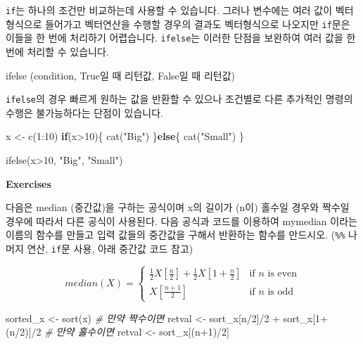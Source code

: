 \documentclass[
]{book}
\newenvironment{Shaded}{\begin{snugshade}}{\end{snugshade}}
\newcommand{\CommentTok}[1]{\textcolor[rgb]{0.56,0.35,0.01}{\textit{#1}}}
\newcommand{\ControlFlowTok}[1]{\textcolor[rgb]{0.13,0.29,0.53}{\textbf{#1}}}
\newcommand{\DecValTok}[1]{\textcolor[rgb]{0.00,0.00,0.81}{#1}}
\newcommand{\FunctionTok}[1]{\textcolor[rgb]{0.00,0.00,0.00}{#1}}
\newcommand{\NormalTok}[1]{#1}
\newcommand{\OtherTok}[1]{\textcolor[rgb]{0.56,0.35,0.01}{#1}}
\newcommand{\SpecialCharTok}[1]{\textcolor[rgb]{0.00,0.00,0.00}{#1}}
\newcommand{\StringTok}[1]{\textcolor[rgb]{0.31,0.60,0.02}{#1}}
\begin{document}
\texttt{if}는 하나의 조건만 비교하는데 사용할 수 있습니다. 그러나 변수에는 여러 값이 벡터형식으로 들어가고 벡터연산을 수행할 경우의 결과도 벡터형식으로 나오지만 \texttt{if}문은 이들을 한 번에 처리하기 어렵습니다. \texttt{ifelse}는 이러한 단점을 보완하여 여러 값을 한번에 처리할 수 있습니다.

\begin{Shaded}
\begin{Highlighting}[]
\FunctionTok{ifelse}\NormalTok{ (condition, True일 때 리턴값, False일 때 리턴값)}
\end{Highlighting}
\end{Shaded}

\texttt{ifelse}의 경우 빠르게 원하는 값을 반환할 수 있으나 조건별로 다른 추가적인 명령의 수행은 불가능하다는 단점이 있습니다.

\begin{Shaded}
\begin{Highlighting}[]

\NormalTok{x }\OtherTok{\textless{}{-}} \FunctionTok{c}\NormalTok{(}\DecValTok{1}\SpecialCharTok{:}\DecValTok{10}\NormalTok{)}
\ControlFlowTok{if}\NormalTok{(x}\SpecialCharTok{\textgreater{}}\DecValTok{10}\NormalTok{)\{}
  \FunctionTok{cat}\NormalTok{(}\StringTok{"Big"}\NormalTok{)}
\NormalTok{\}}\ControlFlowTok{else}\NormalTok{\{}
  \FunctionTok{cat}\NormalTok{(}\StringTok{"Small"}\NormalTok{)}
\NormalTok{\}}

\FunctionTok{ifelse}\NormalTok{(x}\SpecialCharTok{\textgreater{}}\DecValTok{10}\NormalTok{, }\StringTok{"Big"}\NormalTok{, }\StringTok{"Small"}\NormalTok{)}
\end{Highlighting}
\end{Shaded}

\textbf{Exercises}

다음은 median (중간값)을 구하는 공식이며 x의 길이가 (n이) 홀수일 경우와 짝수일 경우에 따라서 다른 공식이 사용된다. 다음 공식과 코드를 이용하여 mymedian 이라는 이름의 함수를 만들고 입력 값들의 중간값을 구해서 반환하는 함수를 만드시오. (\texttt{\%\%} 나머지 연산, \texttt{if}문 사용, 아래 중간값 코드 참고)

\[
median(X) =
\begin{cases}
\frac{1}{2} X[\frac{n}{2}] + \frac{1}{2} X[1+\frac{n}{2}] & \mbox{if } n \mbox{ is even} \\
X[\frac{n+1}{2}] & \mbox{if } n \mbox{ is odd}
\end{cases}
\]

\begin{Shaded}
\begin{Highlighting}[]
\NormalTok{sorted\_x }\OtherTok{\textless{}{-}} \FunctionTok{sort}\NormalTok{(x)}
\CommentTok{\# 만약 짝수이면 }
\NormalTok{retval }\OtherTok{\textless{}{-}}\NormalTok{ sort\_x[n}\SpecialCharTok{/}\DecValTok{2}\NormalTok{]}\SpecialCharTok{/}\DecValTok{2} \SpecialCharTok{+}\NormalTok{ sort\_x[}\DecValTok{1}\SpecialCharTok{+}\NormalTok{(n}\SpecialCharTok{/}\DecValTok{2}\NormalTok{)]}\SpecialCharTok{/}\DecValTok{2}
\CommentTok{\# 만약 홀수이면 }
\NormalTok{retval }\OtherTok{\textless{}{-}}\NormalTok{ sort\_x[(n}\SpecialCharTok{+}\DecValTok{1}\NormalTok{)}\SpecialCharTok{/}\DecValTok{2}\NormalTok{]}
\end{Highlighting}
\end{Shaded}
\end{document}
